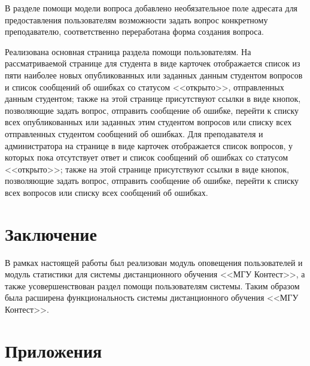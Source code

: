 \documentclass[12pt, a4paper, oneside]{article}
\begin{document}
В разделе помощи модели вопроса добавлено необязательное поле адресата для предоставления пользователям возможности задать вопрос конкретному преподавателю, соответственно переработана форма создания вопроса.

Реализована основная страница раздела помощи пользователям. На рассматриваемой странице для студента в виде карточек отображается список из пяти наиболее новых опубликованных или заданных данным студентом вопросов и список сообщений об ошибках со статусом <<открыто>>, отправленных данным студентом; также на этой странице присутствуют ссылки в виде кнопок, позволяющие задать вопрос, отправить сообщение об ошибке, перейти к списку всех опубликованных или заданных этим студентом вопросов или списку всех отправленных студентом сообщений об ошибках. Для преподавателя и администратора на странице в виде карточек отображается список вопросов, у которых пока отсутствует ответ и список сообщений об ошибках со статусом <<открыто>>; также на этой странице присутствуют ссылки в виде кнопок, позволяющие задать вопрос, отправить сообщение об ошибке, перейти к списку всех вопросов или списку всех сообщений об ошибках.
\newpage

\section{Заключение}
В рамках настоящей работы был реализован модуль оповещения пользователей и модуль статистики для системы дистанционного обучения <<МГУ Контест>>, а также усовершенствован раздел помощи пользователям системы. Таким образом была расширена функциональность системы дистанционного обучения <<МГУ Контест>>.
\newpage

\section{Приложения}
\end{document}
